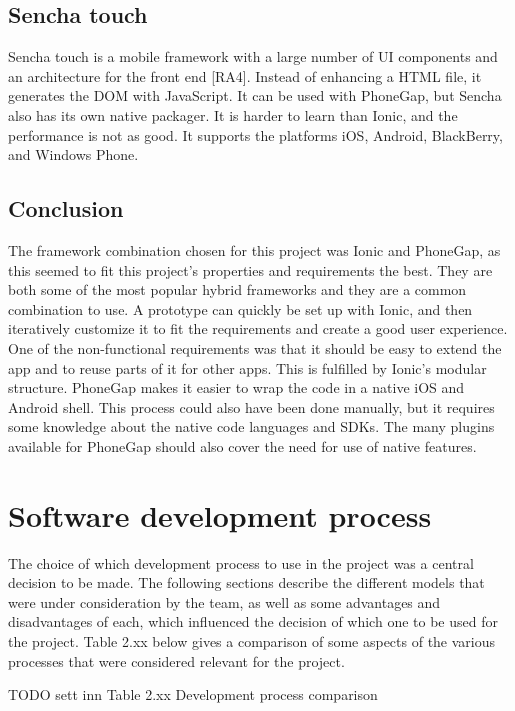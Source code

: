 \subsection{Sencha touch}

Sencha touch is a mobile framework with a large number of UI components and an architecture for the front end [RA4]. Instead of enhancing a HTML file, it generates the DOM with JavaScript. It can be used with PhoneGap, but Sencha also has its own native packager. It is harder to learn than Ionic, and the performance is not as good.  It supports the platforms iOS, Android, BlackBerry, and Windows Phone.

\subsection{Conclusion}

The framework combination chosen for this project was Ionic and PhoneGap, as this seemed to fit this project’s properties and requirements the best. They are both some of the most popular hybrid frameworks and they are a common combination to use. A prototype can quickly be set up with Ionic, and then iteratively customize it to fit the requirements and create a good user experience. One of the non-functional requirements was that it should be easy to extend the app and to reuse parts of it for other apps. This is fulfilled by Ionic’s modular structure. PhoneGap makes it easier to wrap the code in a native iOS and Android shell. This process could also have been done manually, but it requires some knowledge about the native code languages and SDKs. The many plugins available for PhoneGap should also cover the need for use of native features.

\section{Software development process}

The choice of which development process to use in the project was a central decision to be made. The following sections describe the different models that were under consideration by the team, as well as some advantages and disadvantages of each, which influenced the decision of which one to be used for the project. Table 2.xx below gives a comparison of some aspects of the various processes that were considered relevant for the project.

TODO sett inn Table 2.xx Development process comparison\newline

